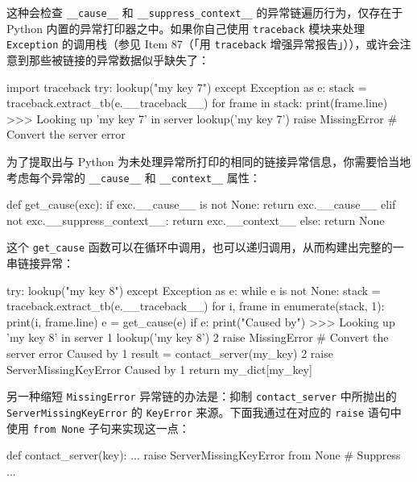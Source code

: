 这种会检查 \texttt{\_\_cause\_\_} 和 \texttt{\_\_suppress\_context\_\_} 的异常链遍历行为，仅存在于 Python 内置的异常打印器之中。如果你自己使用 \texttt{traceback} 模块来处理 \texttt{Exception} 的调用栈（参见 Item 87（「用 \texttt{traceback} 增强异常报告」）），或许会注意到那些被链接的异常数据似乎缺失了：

\begin{codebox}[python]
import traceback
try:
    lookup("my key 7")
except Exception as e:
    stack = traceback.extract_tb(e.__traceback__)
    for frame in stack:
        print(frame.line)
>>>
Looking up 'my key 7' in server
lookup('my key 7')
raise MissingError        # Convert the server error
\end{codebox}

为了提取出与 Python 为未处理异常所打印的相同的链接异常信息，你需要恰当地考虑每个异常的 \texttt{\_\_cause\_\_} 和 \texttt{\_\_context\_\_} 属性：

\begin{codebox}[python]
def get_cause(exc):
    if exc.__cause__ is not None:
        return exc.__cause__
    elif not exc.__suppress_context__:
        return exc.__context__
    else:
        return None
\end{codebox}

这个 \texttt{get\_cause} 函数可以在循环中调用，也可以递归调用，从而构建出完整的一串链接异常：

\begin{codebox}[python]
try:
    lookup("my key 8")
except Exception as e:
    while e is not None:
        stack = traceback.extract_tb(e.__traceback__)
        for i, frame in enumerate(stack, 1):
            print(i, frame.line)
        e = get_cause(e)
        if e:
            print("Caused by")
>>>
Looking up 'my key 8' in server
1 lookup('my key 8')
2 raise MissingError        # Convert the server error
Caused by
1 result = contact_server(my_key)
2 raise ServerMissingKeyError
Caused by
1 return my_dict[my_key]
\end{codebox}

另一种缩短 \texttt{MissingError} 异常链的办法是：抑制 \texttt{contact\_server} 中所抛出的 \texttt{ServerMissingKeyError} 的 \texttt{KeyError} 来源。下面我通过在对应的 \texttt{raise} 语句中使用 \texttt{from None} 子句来实现这一点：

\begin{codebox}[python]
def contact_server(key):
    ...
    raise ServerMissingKeyError from None  # Suppress
    ...
\end{codebox}

